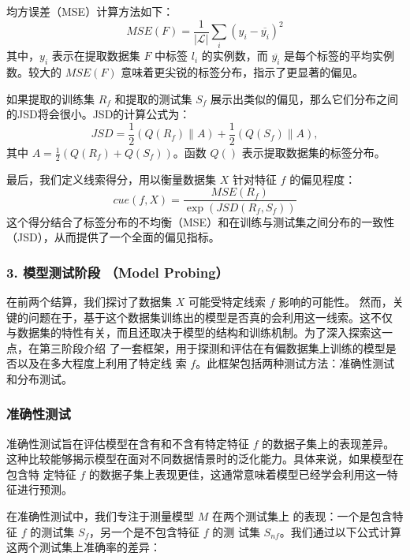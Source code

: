均方误差（MSE）计算方法如下：
\begin{equation}
MSE(F) = \frac{1}{|\mathcal{L}|} \sum_i (y_i - \overline{y_i})^2
\end{equation}
其中，\(y_i\) 表示在提取数据集 \(F\) 中标签 \(l_i\) 的实例数，而 \(\overline{y_i}\) 是每个标签的平均实例数。较大的 \(MSE(F)\) 意味着更尖锐的标签分布，指示了更显著的偏见。

如果提取的训练集 \(R_f\) 和提取的测试集 \(S_f\) 展示出类似的偏见，那么它们分布之间的JSD将会很小。JSD的计算公式为：
\begin{equation}
JSD = \frac{1}{2}\left (Q(R_f) \parallel A \right ) + \frac{1}{2}\left (Q(S_f) \parallel A \right ),
\end{equation}
其中 \(A = \frac{1}{2}\left (Q(R_f) + Q(S_f) \right )\)。函数 \(Q()\) 表示提取数据集的标签分布。

最后，我们定义线索得分，用以衡量数据集 \(X\) 针对特征 \(f\) 的偏见程度：
\begin{equation}
cue(f, X) = \frac{MSE(R_f)}{\exp(JSD(R_f, S_f))}
\end{equation}
这个得分结合了标签分布的不均衡（MSE）和在训练与测试集之间分布的一致性（JSD），从而提供了一个全面的偏见指标。

\subsubsection*{3. 模型测试阶段 （Model Probing）}
\label{sec4:modelprobing}
在前两个结算，我们探讨了数据集 \(X\) 可能受特定线索 \(f\) 影响的可能性。
然而，关键的问题在于，基于这个数据集训练出的模型是否真的会利用这一线索。这不仅
与数据集的特性有关，而且还取决于模型的结构和训练机制。为了深入探索这一点，在第三阶段介绍
了一套框架，用于探测和评估在有偏数据集上训练的模型是否以及在多大程度上利用了特定线
索 \(f\)。此框架包括两种测试方法：准确性测试和分布测试。

\subsubsection*{准确性测试}
\label{sec4:accuracytest}
准确性测试旨在评估模型在含有和不含有特定特征 \(f\) 的数据子集上的表现差异。
这种比较能够揭示模型在面对不同数据情景时的泛化能力。具体来说，如果模型在包含特
定特征 \(f\) 的数据子集上表现更佳，这通常意味着模型已经学会利用这一特征进行预测。

在准确性测试中，我们专注于测量模型 \(M\) 在两个测试集上
的表现：一个是包含特征 \(f\) 的测试集 \(S_f\)，另一个是不包含特征 \(f\) 的测
试集 \(S_{nf}\)。我们通过以下公式计算这两个测试集上准确率的差异：

